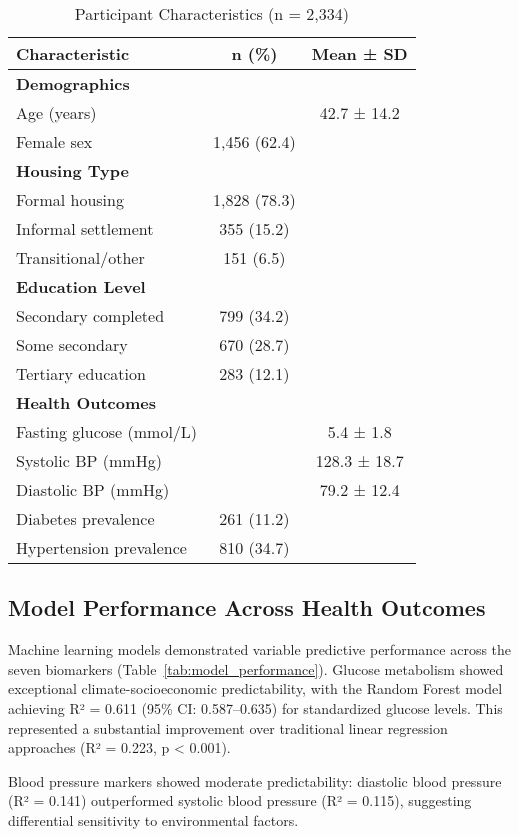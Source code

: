 \documentclass[11pt,a4paper]{article}
\begin{document}
\begin{table}[h]
\caption{Participant Characteristics (n = 2,334)}
\label{tab:characteristics}
\centering
\begin{tabular}{lcc}
\toprule
\textbf{Characteristic} & \textbf{n (\%)} & \textbf{Mean ± SD} \\
\midrule
\multicolumn{3}{l}{\textbf{Demographics}} \\
Age (years) & & 42.7 ± 14.2 \\
Female sex & 1,456 (62.4) & \\
\multicolumn{3}{l}{\textbf{Housing Type}} \\
Formal housing & 1,828 (78.3) & \\
Informal settlement & 355 (15.2) & \\
Transitional/other & 151 (6.5) & \\
\multicolumn{3}{l}{\textbf{Education Level}} \\
Secondary completed & 799 (34.2) & \\
Some secondary & 670 (28.7) & \\
Tertiary education & 283 (12.1) & \\
\multicolumn{3}{l}{\textbf{Health Outcomes}} \\
Fasting glucose (mmol/L) & & 5.4 ± 1.8 \\
Systolic BP (mmHg) & & 128.3 ± 18.7 \\
Diastolic BP (mmHg) & & 79.2 ± 12.4 \\
Diabetes prevalence & 261 (11.2) & \\
Hypertension prevalence & 810 (34.7) & \\
\bottomrule
\end{tabular}
\end{table}

\subsection{Model Performance Across Health Outcomes}

Machine learning models demonstrated variable predictive performance across the seven biomarkers (Table~\ref{tab:model_performance}). Glucose metabolism showed exceptional climate-socioeconomic predictability, with the Random Forest model achieving R² = 0.611 (95\% CI: 0.587--0.635) for standardized glucose levels. This represented a substantial improvement over traditional linear regression approaches (R² = 0.223, p < 0.001).

Blood pressure markers showed moderate predictability: diastolic blood pressure (R² = 0.141) outperformed systolic blood pressure (R² = 0.115), suggesting differential sensitivity to environmental factors.
\end{document}
